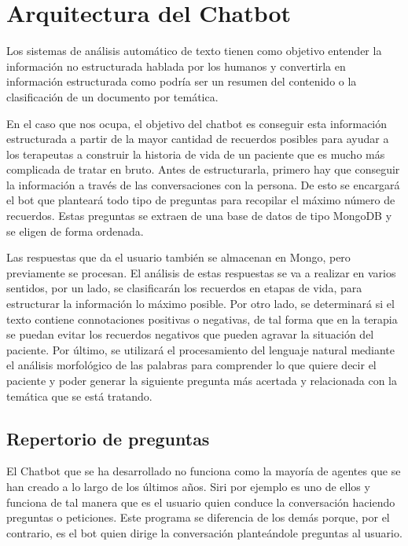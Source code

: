 \chapter{Arquitectura del Chatbot}
\label{cap:arquitectura}

Los sistemas de análisis automático de texto tienen como objetivo entender la información no estructurada hablada por los humanos y convertirla en información estructurada como podría ser un resumen del contenido o la clasificación de un documento por temática.

En el caso que nos ocupa, el objetivo del chatbot es conseguir esta información estructurada a partir de la mayor cantidad de recuerdos posibles para ayudar a los terapeutas a construir la historia de vida de un paciente que es mucho más complicada de tratar en bruto. Antes de estructurarla, primero hay que conseguir la información a través de las conversaciones con la persona. De esto se encargará el bot que planteará todo tipo de preguntas para recopilar el máximo número de recuerdos. Estas preguntas se extraen de una base de datos de tipo MongoDB y se eligen de forma ordenada. 

Las respuestas que da el usuario también se almacenan en Mongo, pero previamente se procesan. El análisis de estas respuestas se va a realizar en varios sentidos, por un lado, se clasificarán los recuerdos en etapas de vida, para estructurar la información lo máximo posible. Por otro lado, se determinará si el texto contiene connotaciones positivas o negativas, de tal forma que en la terapia se puedan evitar los recuerdos negativos que pueden agravar la situación del paciente. Por último, se utilizará el procesamiento del lenguaje natural mediante el análisis morfológico de las palabras para comprender lo que quiere decir el paciente y poder generar la siguiente pregunta más acertada y relacionada con la temática que se está tratando. 

\section {Repertorio de preguntas}

El Chatbot que se ha desarrollado no funciona como la mayoría de agentes que se han creado a lo largo de los últimos años. Siri por ejemplo es uno de ellos y funciona de tal manera que es el usuario quien conduce la conversación haciendo preguntas o peticiones. Este programa se diferencia de los demás porque, por el contrario, es el bot quien dirige la conversación planteándole preguntas al usuario. 

